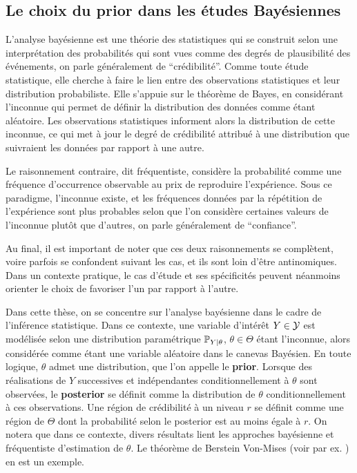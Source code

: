 \subsection{Le choix du prior dans les études Bayésiennes}



L'analyse bayésienne est une théorie des statistiques qui se construit selon une interprétation des probabilités qui sont vues comme des degrés de plausibilité des événements, on parle généralement de ``crédibilité''. 
Comme toute étude statistique, elle cherche à faire le lien entre des observations statistiques et leur distribution probabiliste. %
Elle s'appuie sur le théorème de Bayes, en considérant l'inconnue qui permet de définir la distribution des données comme étant aléatoire. Les observations statistiques informent alors la distribution de cette inconnue, ce qui met  à jour le degré de crédibilité attribué à une distribution que suivraient les données par rapport à une autre.


Le raisonnement contraire, dit fréquentiste, considère la probabilité comme une fréquence d'occurrence observable au prix de reproduire l'expérience. Sous ce paradigme, l'inconnue existe, 
et les fréquences données par la répétition de l'expérience sont plus probables selon que l'on considère certaines valeurs de l'inconnue plutôt que d'autres, on parle généralement de ``confiance''.


Au final, il est important de noter que ces deux raisonnements se complètent, voire parfois se confondent suivant les cas, et ils sont loin d'être antinomiques. Dans un contexte pratique, le cas d'étude et ses spécificités peuvent néanmoins orienter le choix de favoriser l'un par rapport à l'autre.


Dans cette thèse, on se concentre sur l'analyse bayésienne dans le cadre de l'inférence statistique. Dans ce contexte, une variable d'intérêt $Y\in\mathcal{Y}$ est modélisée selon une distribution paramétrique $\mathbb{P}_{Y|\theta}$, $\theta\in\Theta$ étant l'inconnue, alors considérée comme étant une variable aléatoire dans le canevas Bayésien.
En toute logique, $\theta$ admet une distribution, que l'on appelle le \textbf{prior}.
Lorsque des réalisations de $Y$ successives et indépendantes conditionnellement à $\theta$ sont observées, le \textbf{posterior} se définit comme la distribution de $\theta$ conditionnellement à ces observations. Une région de crédibilité à un niveau $r$ se définit comme une région de $\Theta$ dont la probabilité selon le posterior est au moins égale à $r$.
On notera que dans ce contexte, divers résultats lient les approches bayésienne et fréquentiste d'estimation de $\theta$. Le théorème de Berstein Von-Mises (voir par ex. \cite{van_der_vaart_asymptotic_1992}) en est un exemple.


